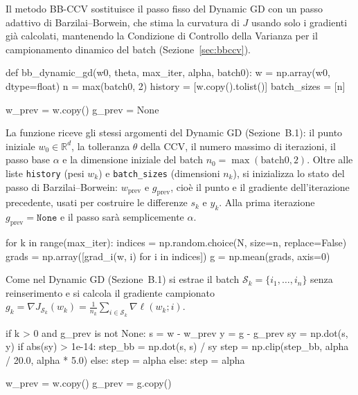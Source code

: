 \documentclass[a4paper,12pt]{article}
\numberwithin{equation}{section}
\numberwithin{figure}{section}
\numberwithin{table}{section}
\begin{document}
Il metodo BB-CCV sostituisce il passo fisso del Dynamic GD con un passo
adattivo di Barzilai--Borwein, che stima la curvatura di $J$ usando solo i
gradienti già calcolati, mantenendo la Condizione di Controllo della Varianza
per il campionamento dinamico del batch (Sezione~\ref{sec:bbccv}).

\begin{pythoncode}[title= BB-CCV]

def bb_dynamic_gd(w0, theta, max_iter, alpha, batch0):
    w = np.array(w0, dtype=float)
    n = max(batch0, 2)
    history     = [w.copy().tolist()]
    batch_sizes = [n]

    w_prev = w.copy()
    g_prev = None
\end{pythoncode}

La funzione riceve gli stessi argomenti del Dynamic GD (Sezione~B.1): il punto
iniziale $w_0 \in \mathbb{R}^d$, la tolleranza $\theta$ della CCV, il numero
massimo di iterazioni, il passo base $\alpha$ e la dimensione iniziale del
batch $n_0 = \max(\text{batch0}, 2)$. Oltre alle liste \texttt{history} (pesi
$w_k$) e \texttt{batch\_sizes} (dimensioni $n_k$), si inizializza lo stato del
passo di Barzilai--Borwein: $w_{\text{prev}}$ e $g_{\text{prev}}$, cioè il punto
e il gradiente dell'iterazione precedente, usati per costruire le differenze
$s_k$ e $y_k$. Alla prima iterazione $g_{\text{prev}} = \texttt{None}$ e il passo
sarà semplicemente $\alpha$.

\begin{pythoncode}[title= BB-CCV]

    for k in range(max_iter):
        indices = np.random.choice(N, size=n, replace=False)
        grads = np.array([grad_i(w, i) for i in indices])
        g = np.mean(grads, axis=0)
\end{pythoncode}

Come nel Dynamic GD (Sezione~B.1) si estrae il batch
$\mathcal{S}_k = \{i_1,\dots,i_n\}$ senza reinserimento e si calcola il
gradiente campionato
$g_k = \nabla J_{\mathcal{S}_k}(w_k) = \frac{1}{n_k}\sum_{i\in\mathcal{S}_k}\nabla\ell(w_k;i)$.

\begin{pythoncode}[title= BB-CCV]

        if k > 0 and g_prev is not None:
            s = w - w_prev
            y = g - g_prev
            sy = np.dot(s, y)
            if abs(sy) > 1e-14:
                step_bb = np.dot(s, s) / sy
                step = np.clip(step_bb, alpha / 20.0, alpha * 5.0)
            else:
                step = alpha
        else:
            step = alpha

        w_prev = w.copy()
        g_prev = g.copy()
\end{pythoncode}
\end{document}
